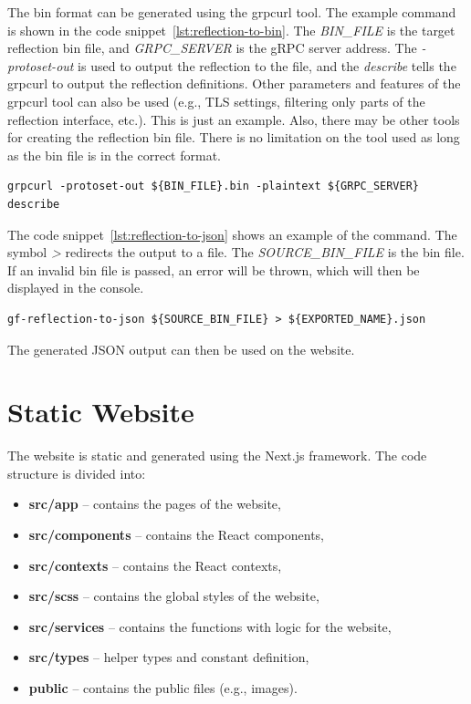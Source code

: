 The bin format can be generated using the grpcurl tool.
The example command is shown in the code snippet~\ref{lst:reflection-to-bin}.
The \textit{BIN\_FILE} is the target reflection bin file, and \textit{GRPC\_SERVER} is the gRPC server address.
The \textit{-protoset-out} is used to output the reflection to the file, and the \textit{describe} tells the grpcurl to output the reflection definitions.
Other parameters and features of the grpcurl tool can also be used (e.g., TLS settings, filtering only parts of the reflection interface, etc.).
This is just an example.
Also, there may be other tools for creating the reflection bin file.
There is no limitation on the tool used as long as the bin file is in the correct format.

\begin{lstlisting}[caption={proto-to-json command example}, label={lst:reflection-to-bin}]
grpcurl -protoset-out ${BIN_FILE}.bin -plaintext ${GRPC_SERVER} describe
\end{lstlisting}

The code snippet~\ref{lst:reflection-to-json} shows an example of the command.
The symbol \textit{\textgreater{}} redirects the output to a file.
The \textit{SOURCE\_BIN\_FILE} is the bin file.
If an invalid bin file is passed, an error will be thrown, which will then be displayed in the console.

\begin{lstlisting}[caption={proto-to-json command example}, label={lst:reflection-to-json}]
gf-reflection-to-json ${SOURCE_BIN_FILE} > ${EXPORTED_NAME}.json
\end{lstlisting}

The generated JSON output can then be used on the website.


\section{Static Website}
The website is static and generated using the Next.js framework.
The code structure is divided into:
\begin{itemize}
    \item \textbf{src/app} -- contains the pages of the website,
    \item \textbf{src/components} -- contains the React components,
    \item \textbf{src/contexts} -- contains the React contexts,
    \item \textbf{src/scss} -- contains the global styles of the website,
    \item \textbf{src/services} -- contains the functions with logic for the website,
    \item \textbf{src/types} -- helper types and constant definition,
    \item \textbf{public} -- contains the public files (e.g., images).
\end{itemize}

